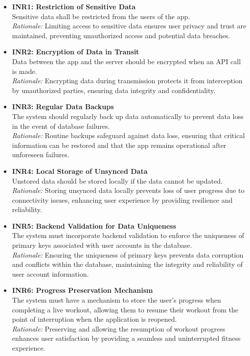 \documentclass[12pt]{article}
\begin{document}
\begin{itemize}
    \item \textbf{INR1: Restriction of Sensitive Data}\\
    Sensitive data shall be restricted from the users of the app.\\
    \textit{Rationale:} Limiting access to sensitive data ensures user privacy and trust are maintained, preventing unauthorized access and potential data breaches.
    
    \item \textbf{INR2: Encryption of Data in Transit}\\
    Data between the app and the server should be encrypted when an API call is made.\\
    \textit{Rationale:} Encrypting data during transmission protects it from interception by unauthorized parties, ensuring data integrity and confidentiality.
    
    \item \textbf{INR3: Regular Data Backups}\\
    The system should regularly back up data automatically to prevent data loss in the event of database failures.\\
    \textit{Rationale:} Routine backups safeguard against data loss, ensuring that critical information can be restored and that the app remains operational after unforeseen failures.
    
    \item \textbf{INR4: Local Storage of Unsynced Data}\\
    Unstored data should be stored locally if the data cannot be updated.\\
    \textit{Rationale:} Storing unsynced data locally prevents loss of user progress due to connectivity issues, enhancing user experience by providing resilience and reliability.
    
    \item \textbf{INR5: Backend Validation for Data Uniqueness}\\
    The system must incorporate backend validation to enforce the uniqueness of primary keys associated with user accounts in the database.\\
    \textit{Rationale:} Ensuring the uniqueness of primary keys prevents data corruption and conflicts within the database, maintaining the integrity and reliability of user account information.
    
    \item \textbf{INR6: Progress Preservation Mechanism}\\
    The system must have a mechanism to store the user's progress when completing a live workout, allowing them to resume their workout from the point of interruption when the application is reopened.\\
    \textit{Rationale:} Preserving and allowing the resumption of workout progress enhances user satisfaction by providing a seamless and uninterrupted fitness experience.
    

\end{itemize}
\end{document}
